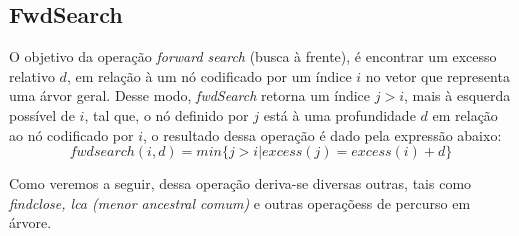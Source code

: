 \subsection{FwdSearch}
    O objetivo da operação \textit{forward search} (busca à frente), é encontrar um excesso relativo $d$, em relação à um nó codificado por um índice $i$ no vetor que 
    representa uma árvor geral. Desse modo, \textit{ fwdSearch} retorna um índice $j>i$, mais à esquerda possível de $i$, tal que, o nó definido por $j$ está à uma profundidade $d$ em relação ao nó codificado por $i$, o resultado 
    dessa operação é dado pela expressão abaixo:
    $$fwdsearch(i,d) = min\{j > i | excess(j) = excess(i) + d\}$$
    
    Como veremos a seguir, dessa operação deriva-se diversas outras, tais como \textit{findclose, lca (menor ancestral comum)} e outras operaçõess de percurso em árvore.

